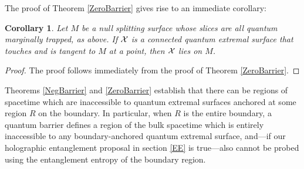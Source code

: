\documentclass[12pt]{article}
\newtheorem{thm}{Theorem}[section]
\newtheorem{cor}[thm]{Corollary}
\theoremstyle{remark}
\numberwithin{equation}{section}
\numberwithin{equation}{section}
\begin{document}
The proof of Theorem \ref{ZeroBarrier} gives rise to an immediate corollary: 

\begin{cor} \label{ZeroCor} Let $M$ be a null splitting surface whose slices are all quantum marginally trapped, as above.  If ${\cal X}$ is a connected quantum extremal surface that touches and is tangent to $M$ at a point, then ${\cal X}$ lies on $M$.\end{cor}
\begin{proof} The proof follows immediately from the proof of Theorem \ref{ZeroBarrier}. \end{proof}

Theorems \ref{NegBarrier} and \ref{ZeroBarrier} establish that there can be regions of spacetime which are inaccessible to quantum extremal surfaces anchored at some region $R$ on the boundary. In particular, when $R$ is the entire boundary, a quantum barrier defines a region of the bulk spacetime which is entirely inaccessible to any boundary-anchored quantum extremal surface, and---if our holographic entanglement proposal in section \ref{EE} is true---also cannot be probed using the entanglement entropy of the boundary region.  


%
\end{document}
